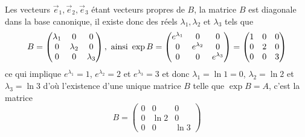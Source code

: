 {\begin{enumerate}
{Les vecteurs $\vec e_1, \vec e_2, \vec e_3$ \'etant vecteurs propres de $B$, la matrice $B$ est diagonale dans la base canonique, il existe donc des r\'eels $\lambda_1,\lambda_2$ et $\lambda_3$ tels que 
$$B=\begin{pmatrix}\lambda_1&0&0 \\  0&\lambda_2&0 \\  0&0&\lambda_3\end{pmatrix},\ {\hbox{ainsi}}\ \exp B=
\begin{pmatrix}e^{\lambda_1}&0&0 \\  0& e^{\lambda_2}&0 \\  0&0&e^{\lambda_3}\end{pmatrix}=\begin{pmatrix}1&0&0 \\  0&2&0 \\  0&0&3\end{pmatrix}$$
ce qui implique $e^{\lambda_1}=1$, $e^{\lambda_2}=2$ et $e^{\lambda_3}=3$ et donc $\lambda_1=\ln 1=0$, $\lambda_2=\ln2$ et $\lambda_3=\ln3$ d'o\`u l'existence d'une unique matrice $B$ telle que $\exp B=A$, c'est la matrice
$$B=\begin{pmatrix}0&0&0 \\  0&\ln2&0 \\  0&0&\ln3\end{pmatrix}$$}
\end{enumerate}
}
